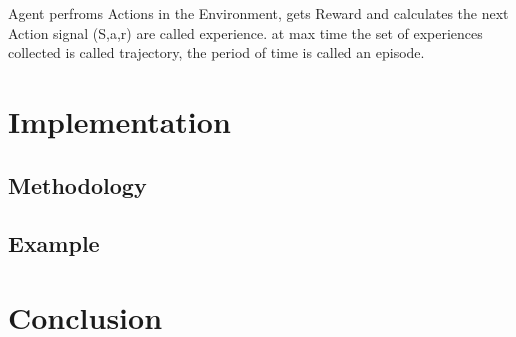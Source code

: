 \documentclass[conference]{IEEEtran}
\begin{document}
Agent perfroms Actions in the Environment, gets Reward and calculates the next Action
signal (S,a,r) are called experience. 
at max time the set of experiences collected is called trajectory, the period of time is called an episode.

\section{Implementation}

\subsection{Methodology}

\subsection{Example}

\section{Conclusion}
 

\end{document}
